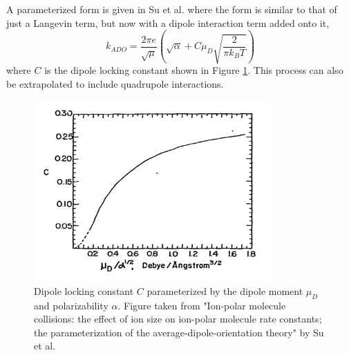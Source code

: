 A parameterized form is given in Su et al. where the form is similar to that of just a Langevin term, but now with a dipole interaction term added onto it,\cite{Su1973a}
\begin{equation}
    k_{ADO} = \frac{2 \pi e}{\sqrt{\mu}}\left(\sqrt{\alpha}+C \mu_D\sqrt{\frac{2}{\pi k_B T}}\right)
    \label{eq: k ADO}
\end{equation}
where $C$ is the dipole locking constant shown in Figure \ref{fig: C}.\cite{Su1973a}\cite{Troe1985} This process can also be extrapolated to include quadrupole interactions.\cite{Su1975}

\begin{figure}[H]
	\label{fig: C}
	\centering
	\includegraphics[width=0.8\textwidth]{images/ADO_C.pdf}
	\caption{Dipole locking constant $C$ parameterized by the dipole moment $\mu_D$ and polarizability $\alpha$. Figure taken from "Ion-polar molecule collisions: the effect of ion size on ion-polar molecule rate constants; the parameterization of the average-dipole-orientation theory" by Su et al.\cite{Su1973a}}
\end{figure}
